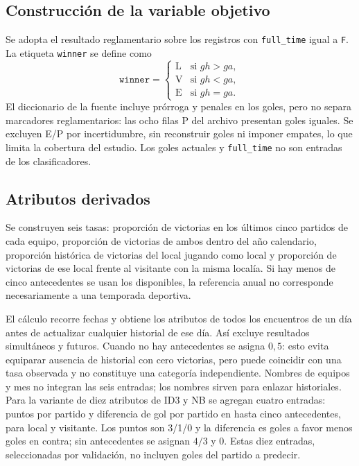 \documentclass[conference]{IEEEtran}
\begin{document}
\subsection{Construcción de la variable objetivo}
Se adopta el resultado reglamentario sobre los registros con \texttt{full\_time} igual a \texttt{F}. La etiqueta \texttt{winner} se define como
\[
\texttt{winner} =
\begin{cases}
\text{L} & \text{si } gh>ga,\\
\text{V} & \text{si } gh<ga,\\
\text{E} & \text{si } gh=ga.
\end{cases}
\]
El diccionario de la fuente incluye prórroga y penales en los goles\cite{b1}, pero no separa marcadores reglamentarios: las ocho filas P del archivo presentan goles iguales. Se excluyen E/P por incertidumbre, sin reconstruir goles ni imponer empates, lo que limita la cobertura del estudio. Los goles actuales y \texttt{full\_time} no son entradas de los clasificadores.

\subsection{Atributos derivados}
Se construyen seis tasas: proporción de victorias en los últimos cinco partidos de cada equipo, proporción de victorias de ambos dentro del año calendario, proporción histórica de victorias del local jugando como local y proporción de victorias de ese local frente al visitante con la misma localía. Si hay menos de cinco antecedentes se usan los disponibles, la referencia anual no corresponde necesariamente a una temporada deportiva.

El cálculo recorre fechas y obtiene los atributos de todos los encuentros de un día antes de actualizar cualquier historial de ese día. Así excluye resultados simultáneos y futuros. Cuando no hay antecedentes se asigna $0{,}5$: esto evita equiparar ausencia de historial con cero victorias, pero puede coincidir con una tasa observada y no constituye una categoría independiente. Nombres de equipos y mes no integran las seis entradas; los nombres sirven para enlazar historiales. Para la variante de diez atributos de ID3 y NB se agregan cuatro entradas: puntos por partido y diferencia de gol por partido en hasta cinco antecedentes, para local y visitante. Los puntos son 3/1/0 y la diferencia es goles a favor menos goles en contra; sin antecedentes se asignan $4/3$ y 0. Estas diez entradas, seleccionadas por validación, no incluyen goles del partido a predecir.
\end{document}
